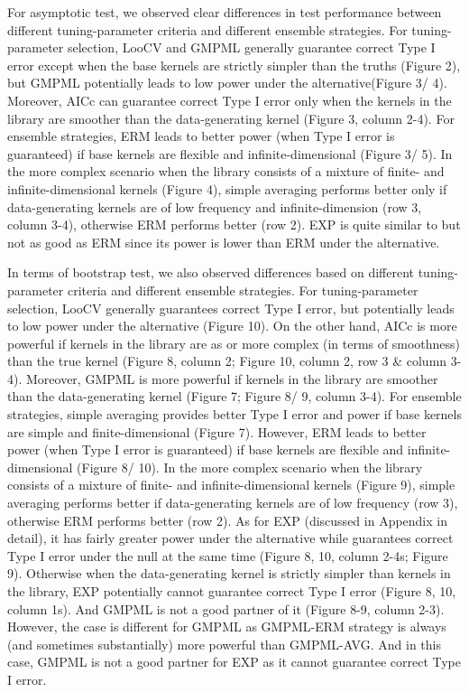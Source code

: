 \documentclass[article]{jss}
\begin{document}
For asymptotic test, we observed clear differences in test performance between different tuning-parameter criteria and different ensemble strategies. For tuning-parameter selection, LooCV and GMPML generally guarantee correct Type I error except when the base kernels are strictly simpler than the truths (Figure 2), but GMPML potentially leads to low power under the alternative(Figure 3/ 4). Moreover, AICc can guarantee correct Type I error only when the kernels in the library are smoother than the data-generating kernel (Figure 3, column 2-4). For ensemble strategies, ERM leads to better power (when Type I error is guaranteed) if base kernels are flexible and infinite-dimensional (Figure 3/ 5). In the more complex scenario when the library consists of a mixture of finite- and infinite-dimensional kernels (Figure 4), simple averaging performs better only if data-generating kernels are of low frequency and infinite-dimension (row 3, column 3-4), otherwise ERM performs better (row 2). EXP is quite similar to but not as good as ERM since its power is lower than ERM under the alternative.

In terms of bootstrap test, we also observed differences based on different tuning-parameter criteria and different ensemble strategies. For tuning-parameter selection, LooCV generally guarantees correct Type I error, but potentially leads to low power under the alternative (Figure 10). On the other hand, AICc is more powerful if kernels in the library are as or more complex (in terms of smoothness) than the true kernel (Figure 8, column 2; Figure 10, column 2, row 3 \& column 3-4). Moreover, GMPML is more powerful if kernels in the library are smoother than the data-generating kernel (Figure 7; Figure 8/ 9, column 3-4). For ensemble strategies, simple averaging provides better Type I error and power if base kernels are simple and finite-dimensional (Figure 7). However, ERM leads to better power (when Type I error is guaranteed) if base kernels are flexible and infinite-dimensional (Figure 8/ 10). In the more complex scenario when the library consists of a mixture of finite- and infinite-dimensional kernels (Figure 9), simple averaging performs better if data-generating kernels are of low frequency (row 3), otherwise ERM performs better (row 2). As for EXP (discussed in Appendix in detail), it has fairly greater power under the alternative while guarantees correct Type I error under the null at the same time (Figure 8, 10, column 2-4s; Figure 9). Otherwise when the data-generating kernel is strictly simpler than kernels in the library, EXP potentially cannot guarantee correct Type I error (Figure 8, 10, column 1s). And GMPML is not a good partner of it (Figure 8-9, column 2-3). However, the case is different for GMPML as GMPML-ERM strategy is always (and sometimes substantially) more powerful than GMPML-AVG. And in this case, GMPML is not a good partner for EXP as it cannot guarantee correct Type I error.
\end{document}
